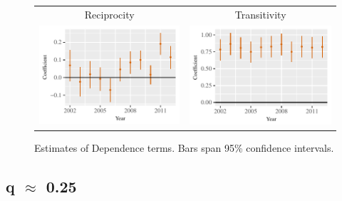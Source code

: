 \documentclass[reqno,onecolumn,letterpaper,12pt]{article}
\begin{document}
{\begin{figure}[!h]
\centering
\begin{tabular}{c@{\hskip 0cm}c}
Reciprocity & Transitivity \\
\includegraphics[height=.2\textheight, clip=true, trim=0cm 0cm 0cm .2cm]{draft_figures/rl_plots50/Mutuality.pdf}    &
\includegraphics[height=.2\textheight, clip=true, trim=0cm 0cm 0cm .2cm]{draft_figures/rl_plots50/Transitivity.pdf}
\end{tabular}
\caption{\label{fig:q50netterms} Estimates of Dependence terms. Bars span 95\% confidence intervals. }
\end{figure}


\subsection{q $\approx$  0.25}

}
\end{document}
